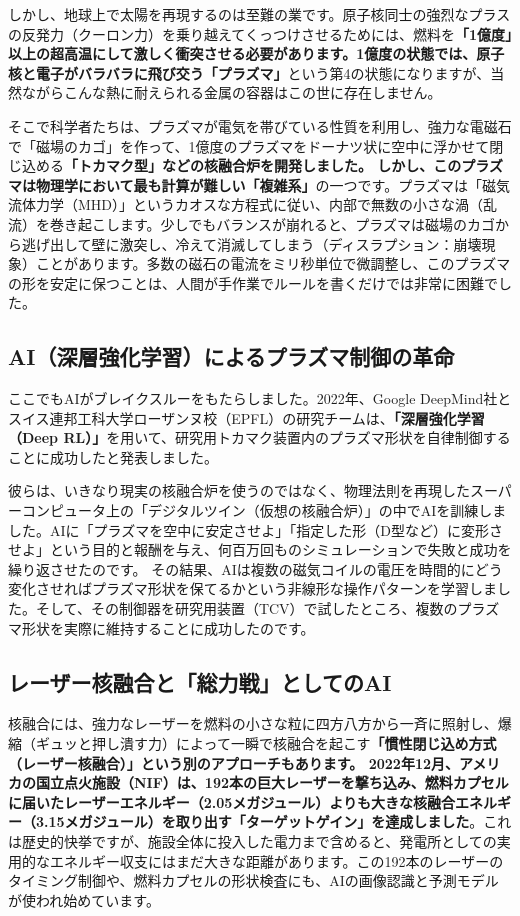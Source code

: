 しかし、地球上で太陽を再現するのは至難の業です。原子核同士の強烈なプラスの反発力（クーロン力）を乗り越えてくっつけさせるためには、燃料を\textbf{「1億度」以上の超高温にして激しく衝突させる必要があります。1億度の状態では、原子核と電子がバラバラに飛び交う「プラズマ」}という第4の状態になりますが、当然ながらこんな熱に耐えられる金属の容器はこの世に存在しません。

そこで科学者たちは、プラズマが電気を帯びている性質を利用し、強力な電磁石で「磁場のカゴ」を作って、1億度のプラズマをドーナツ状に空中に浮かせて閉じ込める\textbf{「トカマク型」などの核融合炉を開発しました。 しかし、このプラズマは物理学において最も計算が難しい「複雑系」}の一つです。プラズマは「磁気流体力学（MHD）」というカオスな方程式に従い、内部で無数の小さな渦（乱流）を巻き起こします。少しでもバランスが崩れると、プラズマは磁場のカゴから逃げ出して壁に激突し、冷えて消滅してしまう（ディスラプション：崩壊現象）ことがあります。多数の磁石の電流をミリ秒単位で微調整し、このプラズマの形を安定に保つことは、人間が手作業でルールを書くだけでは非常に困難でした。

\subsection{AI（深層強化学習）によるプラズマ制御の革命}

ここでもAIがブレイクスルーをもたらしました。2022年、Google DeepMind社とスイス連邦工科大学ローザンヌ校（EPFL）の研究チームは、\textbf{「深層強化学習（Deep RL）」}を用いて、研究用トカマク装置内のプラズマ形状を自律制御することに成功したと発表しました。

彼らは、いきなり現実の核融合炉を使うのではなく、物理法則を再現したスーパーコンピュータ上の「デジタルツイン（仮想の核融合炉）」の中でAIを訓練しました。AIに「プラズマを空中に安定させよ」「指定した形（D型など）に変形させよ」という目的と報酬を与え、何百万回ものシミュレーションで失敗と成功を繰り返させたのです。 その結果、AIは複数の磁気コイルの電圧を時間的にどう変化させればプラズマ形状を保てるかという非線形な操作パターンを学習しました。そして、その制御器を研究用装置（TCV）で試したところ、複数のプラズマ形状を実際に維持することに成功したのです。

\subsection{レーザー核融合と「総力戦」としてのAI}

核融合には、強力なレーザーを燃料の小さな粒に四方八方から一斉に照射し、爆縮（ギュッと押し潰す力）によって一瞬で核融合を起こす\textbf{「慣性閉じ込め方式（レーザー核融合）」という別のアプローチもあります。 2022年12月、アメリカの国立点火施設（NIF）は、192本の巨大レーザーを撃ち込み、燃料カプセルに届いたレーザーエネルギー（2.05メガジュール）よりも大きな核融合エネルギー（3.15メガジュール）を取り出す「ターゲットゲイン」を達成しました}。これは歴史的快挙ですが、施設全体に投入した電力まで含めると、発電所としての実用的なエネルギー収支にはまだ大きな距離があります。この192本のレーザーのタイミング制御や、燃料カプセルの形状検査にも、AIの画像認識と予測モデルが使われ始めています。

